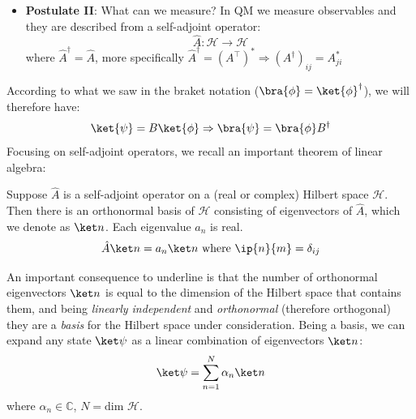 \noindent {}
\begin{itemize}
    \item \textbf{Postulate II}: What can we measure? In QM we measure observables and they are described from a self-adjoint operator:
    \begin{equation*}
        \hat A: \mathcal{H}\rightarrow \mathcal{H}
    \end{equation*}
    where $\hat A^\dagger=\hat A$, more specifically $\hat A^\dagger = (A^\intercal)^* \Rightarrow (A^\dagger)_{ij}=A^*_{ji}$
\end{itemize}
\noindent According to what we saw in the braket notation ($\bra{\phi}=\ket{\phi}^\dagger$), we will therefore have:
\begin{equation*}
    \ket{\psi}=B\ket{\phi} \Rightarrow \bra{\psi}=\bra{\phi}B^\dagger
\end{equation*}
\noindent Focusing on self-adjoint operators, we recall an important theorem of linear algebra:
\begin{theorem}
    Suppose $\hat A$ is a self-adjoint operator on a (real or complex) Hilbert space $\mathcal{H}$. Then there is an orthonormal basis of $\mathcal{H}$ consisting of eigenvectors of $\hat A$, which we denote as $\ket n$. Each eigenvalue $a_n$ is real.
    \begin{equation*}
        \hat A\ket n = a_n \ket n \text{ where } \ip{n}{m} = \delta_{ij}
    \end{equation*}
\end{theorem}
\noindent An important consequence to underline is that the number of orthonormal eigenvectors $\ket n$ is equal to the dimension of the Hilbert space that contains them, and being \textit{linearly independent} and \textit{orthonormal} (therefore orthogonal) they are a \textit{basis} for the Hilbert space under consideration. Being a basis, we can expand any state $\ket \psi$ as a linear combination of eigenvectors $\ket n$:
\begin{equation*}
    \ket \psi = \sum_{n=1}^N\alpha_n\ket n
\end{equation*}
\noindent where $\alpha_n\in\mathbb{C}$, $N=\text{dim } \mathcal{H}$.

